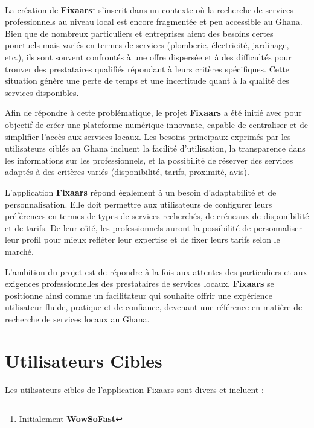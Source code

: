 La création de \textbf{Fixaars}\footnote{Initialement \textbf{WowSoFast}} s’inscrit dans un contexte où la recherche de services professionnels au niveau local est encore fragmentée et peu accessible au Ghana. Bien que de nombreux particuliers et entreprises aient des besoins certes ponctuels mais variés en termes de services (plomberie, électricité, jardinage, etc.), ils sont souvent confrontés à une offre dispersée et à des difficultés pour trouver des prestataires qualifiés répondant à leurs critères spécifiques. Cette situation génère une perte de temps et une incertitude quant à la qualité des services disponibles.

\vspace{0.35cm}

Afin de répondre à cette problématique, le projet \textbf{Fixaars} a été initié avec pour objectif de créer une plateforme numérique innovante, capable de centraliser et de simplifier l’accès aux services locaux. Les besoins principaux exprimés par les utilisateurs ciblés au Ghana incluent la facilité d’utilisation, la transparence dans les informations sur les professionnels, et la possibilité de réserver des services adaptés à des critères variés (disponibilité, tarifs, proximité, avis).

\vspace{0.35cm}

L’application \textbf{Fixaars} répond également à un besoin d’adaptabilité et de personnalisation. Elle doit permettre aux utilisateurs de configurer leurs préférences en termes de types de services recherchés, de créneaux de disponibilité et de tarifs. De leur côté, les professionnels auront la possibilité de personnaliser leur profil pour mieux refléter leur expertise et de fixer leurs tarifs selon le marché.

\vspace{0.35cm}

L'ambition du projet est de répondre à la fois aux attentes des particuliers et aux exigences professionnelles des prestataires de services locaux. \textbf{Fixaars} se positionne ainsi comme un facilitateur qui souhaite offrir une expérience utilisateur fluide, pratique et de confiance, devenant une référence en matière de recherche de services locaux au Ghana.

\section{Utilisateurs Cibles}

Les utilisateurs cibles de l'application Fixaars sont divers et incluent :

